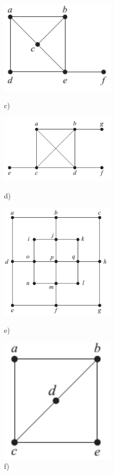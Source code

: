 \documentclass[a4paper]{article}
\begin{document}
	\begin{figure}[H]
		\begin{minipage}{0.5\textwidth}
			\centering
			\includegraphics[width=0.5\textwidth]{tut915_3.png}
			\caption*{c)}
		\end{minipage}
		\begin{minipage}{0.5\textwidth}
			\centering
			\includegraphics[width=0.5\textwidth]{tut915_4.png}
			\caption*{d)}
		\end{minipage}
		\begin{minipage}{0.5\textwidth}
			\centering
			\includegraphics[width=0.5\textwidth]{tut915_5.png}
			\caption*{e)}
		\end{minipage}
		\begin{minipage}{0.5\textwidth}
			\centering
			\includegraphics[width=0.5\textwidth]{tut915_6.png}
			\caption*{f)}
		\end{minipage}
	\end{figure}
\end{document}

